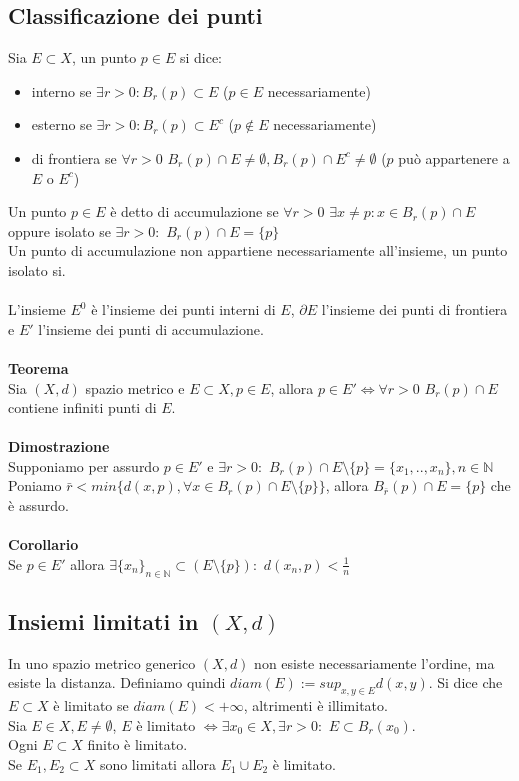 \documentclass{article}
\begin{document}
\subsection{Classificazione dei punti}
Sia $E\subset X$, un punto $p\in E$ si dice:
\begin{itemize}
    \item interno se $\exists r>0:B_r(p)\subset E$ ($p\in E$ necessariamente)
    \item esterno se $\exists r>0: B_r(p)\subset E^c$ ($p\notin E$ necessariamente)
    \item di frontiera se $\forall r>0$ $B_r(p)\cap E \neq \emptyset, B_r(p)\cap E^c \neq \emptyset$ ($p$ può appartenere a $E$ o $E^c$)
\end{itemize}
Un punto $p\in E$ è detto di accumulazione se $\forall r>0$ $\exists x\neq p:x\in B_r(p)\cap E$ oppure isolato se $\exists r>0:$ $B_r(p)\cap E=\{p\}$\\
Un punto di accumulazione non appartiene necessariamente all'insieme, un punto isolato si.\\\\
L'insieme $E^0$ è l'insieme dei punti interni di $E$, $\partial E$ l'insieme dei punti di frontiera e $E'$ l'insieme dei punti di accumulazione.\\\\
\textbf{Teorema}\\
Sia $(X,d)$ spazio metrico e $E\subset X, p\in E$, allora $p\in E'\Leftrightarrow\forall r>0$ $B_r(p)\cap E$ contiene infiniti punti di $E$.\\\\
\textbf{Dimostrazione}\\
Supponiamo per assurdo $p\in E'$ e $\exists r>0:$ $B_r(p)\cap E\setminus\{p\}=\{x_1,..,x_n\}, n\in\mathds{N}$\\
Poniamo $\bar{r}<min\{d(x,p), \forall x\in B_r(p)\cap E\setminus\{p\}\}$, allora $B_{\bar{r}}(p)\cap E=\{p\}$ che è assurdo.\\
\\
\textbf{Corollario}\\
Se $p\in E'$ allora $\exists\{x_n\}_{n\in\mathds{N}}\subset(E\setminus\{p\}):$ $d(x_n,p)<\frac{1}{n}$

\subsection{Insiemi limitati in $(X,d)$}
In uno spazio metrico generico $(X,d)$ non esiste necessariamente l'ordine, ma esiste la distanza. Definiamo quindi $diam(E):=sup_{x,y\in E}d(x,y)$. Si dice che $E\subset X$ è limitato se $diam(E)<+\infty$, altrimenti è illimitato.\\
Sia $E\in X, E\neq \emptyset$, $E$ è limitato $\Leftrightarrow\exists x_0\in X, \exists r>0:$ $E\subset B_r(x_0)$.\\
Ogni $E\subset X$ finito è limitato.\\
Se $E_1,E_2\subset X$ sono limitati allora $E_1 \cup E_2$ è limitato.
\end{document}
